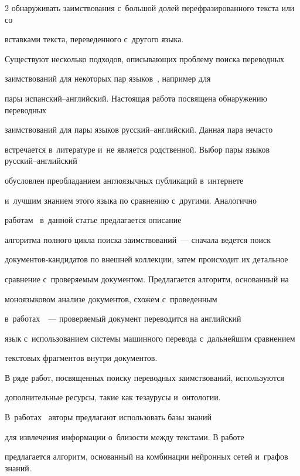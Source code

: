 \begin{multicols}{2}
обнаруживать заимствования с~большой долей перефразированного текста или со 


вставками  текста, переведенного с~другого языка.





Существуют несколько подходов, опи\-сы\-ва\-ющих проб\-ле\-му поиска переводных 


заимствований для некоторых пар языков~\cite{clkga,clfreshonto}, например для 


пары ис\-пан\-ский--анг\-лий\-ский. Настоящая работа посвящена обнаружению переводных 


заимствований для пары языков рус\-ский--анг\-лий\-ский. Данная пара нечасто 


встречается в~литературе и~не является родственной. Выбор пары языков рус\-ский--анг\-лий\-ский 


обуслов\-лен преобладанием англоязычных пуб\-ли\-ка\-ций в~интернете 


и~лучшим знанием этого языка по сравнению с~другими. Аналогично 


работам~\cite{framework1,framework2} в~данной статье предлагается описание 


алгоритма полного цик\-ла поиска заимствований~--- сначала ведется поиск 


до\-ку\-мен\-тов-кан\-ди\-да\-тов по внешней коллекции, затем происходит их детальное 


сравнение с~проверяемым документом. Предлагается алгоритм, основанный на 


моноязыковом анализе документов, схожем с~проведенным 


в~работах~\cite{mono,fruct}~--- про\-ве\-ря\-емый документ переводится на английский 


язык с~использованием системы машинного перевода с~дальнейшим сравнением 


текс\-то\-вых фрагментов внут\-ри документов.





В ряде работ, посвященных поиску переводных заимствований, используются 


дополнительные ресурсы, такие как тезаурусы и~онтологии.


В~работах~\cite{clkga,clfreshonto} авторы предлагают использовать базы знаний 


для извлечения информации о~близости между текстами. В работе~\cite{clfreshonto} 


предлагается алгоритм, основанный на комбинации нейронных сетей и~графов знаний. 



\end{multicols}
